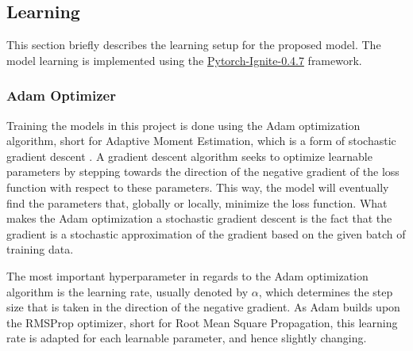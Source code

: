 



\subsection{Learning}
\label{sec:Method:Learning}
This section briefly describes the learning setup for the proposed model.
The model learning is implemented using the \hyperlink{https://pytorch.org/ignite/}{Pytorch-Ignite-0.4.7}\cite{IgniteDocumentation} framework.


\subsubsection{Adam Optimizer}
\label{sec:Method:Learning:Adam}
Training the models in this project is done using the Adam optimization algorithm, short for Adaptive Moment Estimation, which is a form of stochastic gradient descent \cite{Kingma2014Adam:Optimization}.
A gradient descent algorithm seeks to optimize learnable parameters by stepping towards the direction of the negative gradient of the loss function with respect to these parameters.
This way, the model will eventually find the parameters that, globally or locally, minimize the loss function.
What makes the Adam optimization a stochastic gradient descent is the fact that the gradient is a stochastic approximation of the gradient based on the given batch of training data.

The most important hyperparameter in regards to the Adam optimization algorithm is the learning rate, usually denoted by $\alpha$, which determines the step size that is taken in the direction of the negative gradient. 
As Adam builds upon the RMSProp optimizer, short for Root Mean Square Propagation, this learning rate is adapted for each learnable parameter, and hence slightly changing.






